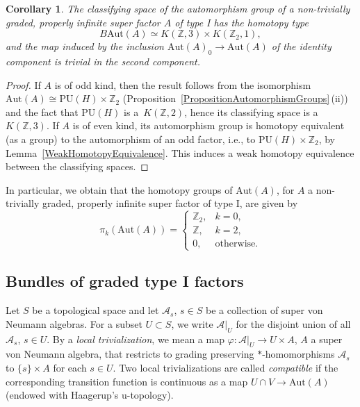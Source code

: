 \documentclass[11pt]{article}
\numberwithin{equation}{section}
\numberwithin{equation}{section}
\newtheorem{Corollary}[Theorem]{Corollary}
\newcommand{\Z}{\mathbb{Z}}
\newcommand{\A}{\mathcal{A}}
\newcommand{\Aut}{\mathrm{Aut}}
\begin{document}
\begin{Corollary} \label{CorollaryHomotopyType}
The classifying space of the automorphism group of a non-trivially graded, properly infinite super factor $A$ of type I has the homotopy type
\begin{equation*}
B\Aut(A) \simeq K(\Z, 3) \times K(\Z_2, 1),
\end{equation*}
and the map induced by the inclusion $\Aut(A)_0 \to \Aut(A)$ of the identity component is trivial in the second component.
\end{Corollary}

\begin{proof}
If $A$ is of odd kind, then the result follows from the isomorphism ${\Aut(A) \cong \mathrm{PU}(H)\times \Z_2}$ (Proposition~\ref{PropositionAutomorphismGroups}\,(ii)) and the fact that $\mathrm{PU}(H)$ is a~$K(\Z, 2)$, hence its classifying space is a~$K(\Z, 3)$.
If $A$ is of even kind, its automorphism group is homotopy equivalent (as a group) to the automorphism of an odd factor, i.e., to $\mathrm{PU}(H) \times \Z_2$, by Lemma~\ref{WeakHomotopyEquivalence}.
This induces a weak homotopy equivalence between the classifying spaces.
\end{proof}

In particular, we obtain that the homotopy groups of $\Aut(A)$, for $A$ a non-trivially graded, properly infinite super factor of type I, are given by
\begin{equation} \label{HomotopyGroupsAutA}
 \pi_k(\Aut(A)) = \begin{cases} \Z_2, & k=0, \\ \Z, & k=2, \\ 0, & \text{otherwise}. \end{cases}
\end{equation}

\subsection{Bundles of graded type I factors} \label{SectionBundles}

Let $S$ be a topological space and let $\A_s$, $s \in S$ be a collection of super von Neumann algebras.
For a subset $U \subset S$, we write $\A|_U$ for the disjoint union of all $\A_s$, $s \in U$.
By a \emph{local trivialization}, we mean a map $\varphi\colon \A|_U \to U \times A$, $A$ a super von Neumann algebra, that restricts to grading preserving $*$-homomorphisms $\A_s$ to $\{s\} \times A$ for each $s \in U$.
Two local trivializations are called \emph{compatible} if the corresponding transition function is continuous as a map $U \cap V \to \Aut(A)$ (endowed with Haagerup's u-topology).
\end{document}
